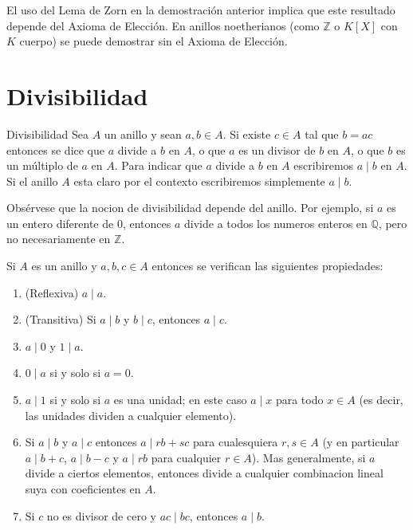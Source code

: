 \begin{remark}
El uso del Lema de Zorn en la demostración anterior implica que este resultado depende del Axioma de Elección. En anillos noetherianos (como \(\mathbb{Z}\) o \(K[X]\) con \(K\) cuerpo) se puede demostrar sin el Axioma de Elección.
\end{remark}

\clearpage
\section{Divisibilidad}

\begin{definition}{Divisibilidad}{}
Sea \(A\) un anillo y sean \(a, b \in A\). Si existe \(c \in A\) tal que \(b = ac\) entonces se dice que \(a\) divide a \(b\) en \(A\), o que \(a\) es un divisor de \(b\) en \(A\), o que \(b\) es un múltiplo de \(a\) en \(A\). Para indicar que \(a\) divide a \(b\) en \(A\) escribiremos \(a \mid b\) en \(A\). Si el anillo \(A\) esta claro por el contexto escribiremos simplemente \(a \mid b\).
\end{definition}

Obsérvese que la nocion de divisibilidad depende del anillo. Por ejemplo, si \(a\) es un entero diferente de \(0\), entonces \(a\) divide a todos los numeros enteros en \(\mathbb{Q}\), pero no necesariamente en \(\mathbb{Z}\).

\begin{lemma}{}{}
Si \(A\) es un anillo y \(a, b, c \in A\) entonces se verifican las siguientes propiedades:

\begin{enumerate}
\item (Reflexiva) \(a \mid a\).

\item (Transitiva) Si \(a \mid b\) y \(b \mid c\), entonces \(a \mid c\).

\item \(a \mid 0\) y \(1 \mid a\).

\item \(0 \mid a\) si y solo si \(a = 0\).

\item \(a \mid 1\) si y solo si \(a\) es una unidad; en este caso \(a \mid x\) para todo \(x \in A\) (es decir, las unidades dividen a cualquier elemento).

\item Si \(a \mid b\) y \(a \mid c\) entonces \(a \mid rb + sc\) para cualesquiera \(r, s \in A\) (y en particular \(a \mid b + c\), \(a \mid b - c\) y \(a \mid rb\) para cualquier \(r \in A\)). Mas generalmente, si \(a\) divide a ciertos elementos, entonces divide a cualquier combinacion lineal suya con coeficientes en \(A\).

\item Si \(c\) no es divisor de cero y \(ac \mid bc\), entonces \(a \mid b\).
\end{enumerate}
\end{lemma}

